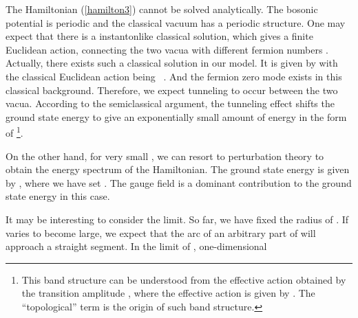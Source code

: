 \documentclass[a4paper,12pt]{article}
\begin{document}
The Hamiltonian (\ref{hamilton3}) cannot be solved 
analytically. The bosonic potential \coordHE{}
is periodic and the classical vacuum has a periodic structure. One may expect 
that there is a instantonlike classical solution, which gives a finite 
Euclidean action, connecting the two vacua with different 
fermion numbers \coordHE{}. Actually, there exists such a classical 
solution in our model. It is given by 
\coordHE{}
with the classical Euclidean action being \coordHE{}~. And the fermion zero 
mode exists in this classical background. Therefore, we expect 
tunneling to occur between the two vacua. According to the semiclassical 
argument, the tunneling effect shifts the ground state energy to give 
an exponentially small amount of energy in the form of
\coordHE{}\footnote{This band structure
\myHighlight{$\cos{2\pi\alpha}$}\coordHE{} can be understood from the effective action 
obtained by the transition amplitude \coordHE{}, where the effective action is given by 
\coordHE{}. The ``topological'' term 
\myHighlight{$\alpha{\dot\theta}$}\coordHE{} is the origin of such band structure\cite{raja}.}. 
\par
On the other hand, for very small \coordHE{}, we
can resort to perturbation theory to obtain the energy spectrum of
the Hamiltonian. The ground state energy is given by 
\coordHE{}, where we have set \coordHE{}. 
The gauge field \myHighlight{$\alpha$}\coordHE{} is a dominant contribution to the ground state
energy in this case.    
\par
It may be interesting to consider the \coordHE{} limit.
So far, we have fixed the radius \coordHE{} of \coordHE{}. If \coordHE{} varies to become 
large, we expect that the arc of an arbitrary part of \coordHE{} will approach 
a straight segment. In the limit of \coordHE{}, one-dimensional 
\end{document}
